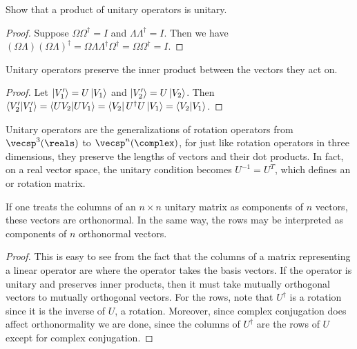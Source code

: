\begin{exercise}
Show that a product of unitary operators is unitary.
\end{exercise}

\begin{proof}
Suppose $\Omega\Omega^\dagger = I$ and $\Lambda\Lambda^\dagger = I$. Then we have $(\Omega\Lambda)(\Omega\Lambda)^\dagger = \Omega\Lambda\Lambda^\dagger\Omega^\dagger = \Omega\Omega^\dagger = I$.
\end{proof}

\begin{theorem}\label{unitary preserve inner products}
Unitary operators preserve the inner product between the vectors they act on.
\end{theorem}

\begin{proof}
Let $\ket{V'_1} = U\ket{V_1}$ and $\ket{V'_2} = U\ket{V_2}$. Then $\braket{V'_2}{V'_1} = \braket{UV_2}{UV_1} = \bra{V_2}U^\dagger U\ket{V_1} = \braket{V_2}{V_1}$.
\end{proof}

\begin{remark}
Unitary operators are the generalizations of rotation operators from $\vecsp^3(\reals)$ to $\vecsp^n(\complex)$, for just like rotation operators in three dimensions, they preserve the lengths of vectors and their dot products. In fact, on a real vector space, the unitary condition becomes $U^{-1} = U^T$, which defines an  or rotation matrix.
\end{remark}

\begin{theorem}
If one treats the columns of an $n \times n$ unitary matrix as components of $n$ vectors, these vectors are orthonormal. In the same way, the rows may be interpreted as components of $n$ orthonormal vectors.
\end{theorem}

\begin{proof}
This is easy to see from the fact that the columns of a matrix representing a linear operator are where the operator takes the basis vectors. If the operator is unitary and preserves inner products, then it must take mutually orthogonal vectors to mutually orthogonal vectors. For the rows, note that $U^\dagger$ is a rotation since it is the inverse of $U$, a rotation. Moreover, since complex conjugation does affect orthonormality we are done, since the columns of $U^\dagger$ are the rows of $U$ except for complex conjugation.
\end{proof}

